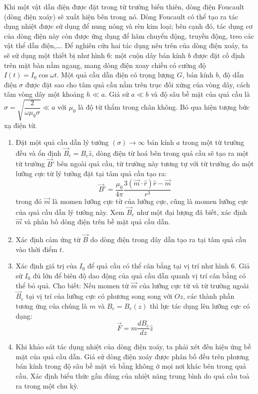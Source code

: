 \vspace{-30px}
\noindent Khi một vật dẫn điện được đặt trong từ trường biến thiên, dòng điện Foucault (dòng điện xoáy) sẽ xuất hiện bên trong nó. Dòng Foucault có thể tạo ra tác dụng nhiệt được sử dụng để nung nóng và rèn kim loại; bên cạnh đó, tác dụng cơ của dòng điện này còn được ứng dụng để hãm chuyển động, truyền động, treo các vật thể dẫn điện,\dots. Để nghiên cứu hai tác dụng nêu trên của dòng điện xoáy, ta sẽ sử dụng một thiết bị như hình 6: một cuộn dây bán kính $b$ được đặt cố định trên mặt bàn nằm ngang, mang dòng điện xoay chiều có cường độ $I(t)=I_{0}\cos\omega t$. Một quả cầu dẫn điện có trọng lượng $G$, bán kính $b$, độ dẫn điện $\sigma$ được đặt sao cho tâm quả cầu nằm trên trục đối xứng của vòng dây, cách tâm vòng dây một khoảng $h\ll a$. Giả sử $a\ll b$ và độ sâu bề mặt của quả cầu là $\sigma=\sqrt{\dfrac{2}{\omega\mu_{9}\sigma}}\ll a$ với $\mu_{0}$ là độ từ thẩm trong chân không. Bỏ qua hiện tượng bức xạ điện từ.
\begin{enumerate}
  \item Đặt một quả cầu dẫn lý tưởng $(\sigma)\rightarrow\infty$ bán kính $a$ trong một từ trường đều và ổn định $\vec{B}_{e}=B_{e}\hat{z}$, dòng điện từ hoá bên trong quả cầu sẽ tạo ra một từ trường $\vec{B}'$ bên ngoài quả cầu, từ trường này tương tự với từ trường do một lưỡng cực từ lý tưởng đặt tại tâm quả cầu tạo ra:
        \begin{equation*}
          \vec{B}'=\frac{\mu_{0}}{4\pi}\frac{3(\vec{m}\cdot\hat{r})\hat{r}-\vec{m}}{r^{3}}
        \end{equation*}
        trong đó $\vec{m}$ là momen lưỡng cực từ của lưỡng cực, cũng là momen lưỡng cực của quả cầu dẫn lý tưởng này. Xem $\vec{B}_{e}$ như một đại lượng đã biết, xác định $\vec{m}$ và phân bố dòng điện trên bề mặt quả cầu dẫn.
  \item Xác định cảm ứng từ $\vec{B}$ do dòng điện trong dây dẫn tạo ra tại tâm quả cầu vào thời điểm $t$.
  \item Xác định giá trị của $I_{0}$ để quả cầu có thể cân bằng tại vị trí như hình 6. Giả sử $I_{0}$ đủ lớn để biên độ dao động của quả cầu dẫn quanh vị trí cân bằng có thể bỏ quả. Cho biết: Nếu momen từ $\vec{m}$ của lưỡng cực từ và từ trường ngoài $\vec{B}_{e}$ tại vị trí của lưỡng cực có phương song song với $Oz$, các thành phần tương ứng của chúng là $m$ và $B_{e}=B_{e}(z)$ thì lực tác dụng lên lưỡng cực có dạng:
        \begin{equation*}
          \vec{F}=m\frac{dB_{e}}{dz}\hat{z}
        \end{equation*}
  \item Khi khảo sát tác dụng nhiệt của dòng điện xoáy, ta phải xét đến hiệu ứng bề mặt của quả cầu dẫn. Giả sử dòng điện xoáy được phân bố đều trên phương bán kính trong độ sâu bề mặt và bằng không ở mọi nơi khác bên trong quả cầu. Xác định biểu thức gần đúng của nhiệt năng trung bình do quả cầu toả ra trong một chu kỳ.
\end{enumerate}